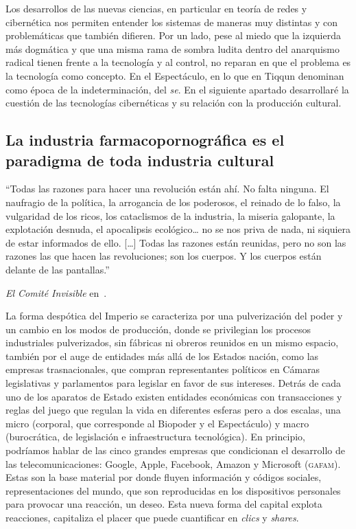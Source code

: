 Los desarrollos de las nuevas ciencias, en particular en teoría de redes y cibernética nos permiten entender los sistemas de maneras muy distintas y con problemáticas que también difieren. Por un lado, pese al miedo que la izquierda más dogmática y que una misma rama de sombra ludita dentro del anarquismo radical tienen frente a la tecnología y al control, no reparan en que el problema es la tecnología como concepto. En el Espectáculo, en lo que en Tiqqun denominan como época de la indeterminación, del \emph{se}. En el siguiente apartado desarrollaré la cuestión de las tecnologías cibernéticas y su relación con la producción cultural.

\subsection{La industria farmacopornográfica es el paradigma de toda industria cultural}
\label{sub:la-industria-farmacopornográfica}

\epigraph{\enquote{Todas las razones para hacer una revolución están ahí. No falta ninguna. El naufragio de la política, la arrogancia de los poderosos, el reinado de lo falso, la vulgaridad de los ricos, los cataclismos de la industria, la miseria galopante, la explotación desnuda, el apocalipsis ecológico\ldots{} no se nos priva de nada, ni siquiera de estar informados de ello. [\ldots] Todas las razones están reunidas, pero no son las razones las que hacen las revoluciones; son los cuerpos. Y los cuerpos están delante de las pantallas.}}{\emph{El Comité Invisible} en~\autocite[p.~7]{comiteinvisibleAhora2017}.}

La forma despótica del Imperio se caracteriza por una pulverización del poder y un cambio en los modos de producción, donde se privilegian los procesos industriales pulverizados, sin fábricas ni obreros reunidos en un mismo espacio, también por el auge de entidades más allá de los Estados nación, como las empresas trasnacionales, que compran representantes políticos en Cámaras legislativas y parlamentos para legislar en favor de sus intereses. Detrás de cada uno de los aparatos de Estado existen entidades económicas con transacciones y reglas del juego que regulan la vida en diferentes esferas pero a dos escalas, una micro (corporal, que corresponde al Biopoder y el Espectáculo) y macro (burocrática, de legislación e infraestructura tecnológica). En principio, podríamos hablar de las cinco grandes empresas que condicionan el desarrollo de las telecomunicaciones: Google, Apple, Facebook, Amazon y Microsoft (\textsc{gafam}). Estas son la base material por donde fluyen información y códigos sociales, representaciones del mundo, que son reproducidas en los dispositivos personales para provocar una reacción, un deseo. Esta nueva forma del capital explota reacciones, capitaliza el placer que puede cuantificar en \emph{clics} y \emph{shares}.

